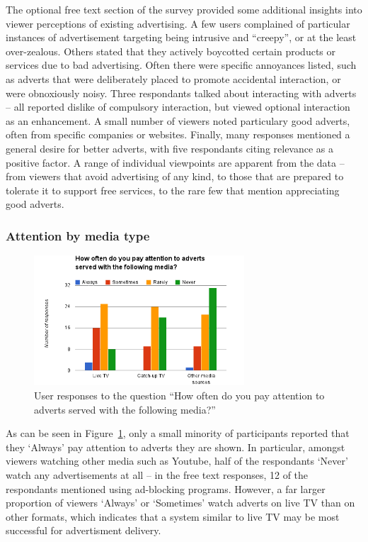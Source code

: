 The optional free text section of the survey provided some additional insights into viewer perceptions of existing advertising.
A few users complained of particular instances of advertisement targeting being intrusive and ``creepy'', or at the least over-zealous. 
Others stated that they actively boycotted certain products or services due to bad advertising.
Often there were specific annoyances listed, such as adverts that were deliberately placed to promote accidental interaction, or were obnoxiously noisy.
Three respondants talked about interacting with adverts -- all reported dislike of compulsory interaction, but viewed optional interaction as an enhancement.
A small number of viewers noted particulary good adverts, often from specific companies or websites. 
Finally, many responses mentioned a general desire for better adverts, with five respondants citing relevance as a positive factor.
A range of individual viewpoints are apparent from the data -- from viewers that avoid advertising of any kind, to those that are prepared to tolerate it to support free services, to the rare few that mention appreciating good adverts.


\subsubsection{Attention by media type}
\label{sec:prestudy_media}
\begin{figure}[H]
	\centering
	\vspace{-10pt}
	\includegraphics[width=0.7\textwidth, clip=true, trim=0 0 0 55pt]{images/prestudy_media.png}
	\caption{User responses to the question ``How often do you pay attention to adverts served with the following media?''}
	\label{fig:prestudy_media}
	\vspace{-15pt}
\end{figure}
As can be seen in Figure~\ref{fig:prestudy_media}, only a small minority of participants reported that they `Always' pay attention to adverts they are shown. In particular, amongst viewers watching other media such as Youtube, half of the respondants `Never' watch any advertisements at all -- in the free text responses, 12 of the respondants mentioned using ad-blocking programs. However, a far larger proportion of viewers `Always' or `Sometimes' watch adverts on live TV than on other formats, which indicates that a system similar to live TV may be most successful for advertisment delivery.

